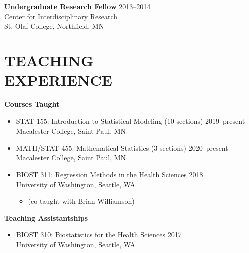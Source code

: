 \documentclass[margin]{res}
\begin{document}
\begin{resume}
\textbf{Undergraduate Research Fellow} \hfill 2013--2014 \\
Center for Interdisciplinary Research \\
St. Olaf College, Northfield, MN \\

\section{TEACHING \\ EXPERIENCE}

\textbf{Courses Taught} \vspace{0.1cm}
\begin{itemize}
\item STAT 155: Introduction to Statistical Modeling (10 sections) \hfill 2019--present \\
Macalester College, Saint Paul, MN

\item MATH/STAT 455: Mathematical Statistics (3 sections) \hfill 2020--present \\
Macalester College, Saint Paul, MN

\item BIOST 311: Regression Methods in the Health Sciences \hfill  2018 \\
University of Washington, Seattle, WA \vspace{-0.2cm}
\begin{itemize} 
				\item[] (co-taught with Brian Williamson)
				\end{itemize}
\end{itemize} 

\newpage

\textbf{Teaching Assistantships} 
\begin{itemize}
\item BIOST 310: Biostatistics for the Health Sciences  \hfill  2017 \\
University of Washington, Seattle, WA \vspace{0.1cm}


\end{itemize}
\end{resume}
\end{document}
